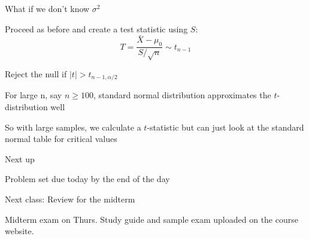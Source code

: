 \documentclass{./../div_teaching_slides}
\begin{document}
\begin{frame}{What if we don't know $\sigma^2$}
\begin{witemize}
  \item Proceed as before and create a test statistic using $S$:
 $$ T = \frac{\bar{X}-\mu_0}{S/\sqrt{n}} \sim t_{n-1} $$ 
\item Reject the null if $|t|> t_{n-1, \alpha/2}$
\item For large n, say $n \geq 100$, standard normal distribution approximates the $t$-distribution well
\item So with large samples, we calculate a $t$-statistic but can just look at the standard normal table for critical values
\end{witemize}
\end{frame}

\begin{frame}{Next up}
\vspace{-0.5em}
\begin{witemize}
\item Problem set due today by the end of the day
  \item Next class: Review for the midterm
  \item Midterm exam on Thurs. Study guide and sample exam uploaded on the course website.
\end{witemize}
\end{frame}
\end{document}
